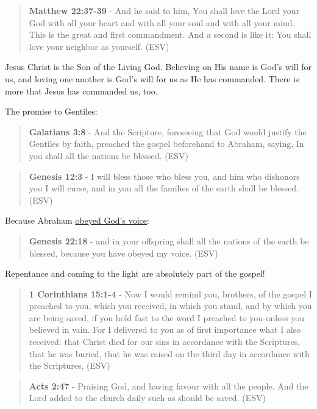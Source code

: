 \documentclass[11pt]{article}
\begin{document}
\begin{quote}
\textbf{Matthew 22:37-39} - And he said to him, You shall love the Lord your God with all your heart and with all your soul and with all your mind. This is the great and first commandment. And a second is like it: You shall love your neighbor as yourself. (ESV)
\end{quote}

Jesus Christ is the Son of the Living God. Believing on His name is God's will for us, and loving one another is God's will for us as He has commanded. There is more that Jesus has commanded us, too.

The promise to Gentiles:

\begin{quote}
\textbf{Galatians 3:8} - And the Scripture, foreseeing that God would justify the Gentiles by faith, preached the gospel beforehand to Abraham, saying, In you shall all the nations be blessed. (ESV)
\end{quote}

\begin{quote}
\textbf{Genesis 12:3} - I will bless those who bless you, and him who dishonors you I will curse, and in you all the families of the earth shall be blessed. (ESV)
\end{quote}

Because Abraham \uline{obeyed God's voice}:

\begin{quote}
\textbf{Genesis 22:18} - and in your offspring shall all the nations of the earth be blessed, because you have obeyed my voice. (ESV)
\end{quote}

Repentance and coming to the light are absolutely part of the gospel!

\begin{quote}
\textbf{1 Corinthians 15:1-4} -  Now I would remind you, brothers, of the gospel I preached to you, which you received, in which you stand, and by which you are being saved, if you hold fast to the word I preached to you-unless you believed in vain.  For I delivered to you as of first importance what I also received: that Christ died for our sins in accordance with the Scriptures, that he was buried, that he was raised on the third day in accordance with the Scriptures,  (ESV)
\end{quote}

\begin{quote}
\textbf{Acts 2:47} - Praising God, and having favour with all the people. And the Lord added to the church daily such as should be saved. (ESV)
\end{quote}
\end{document}
